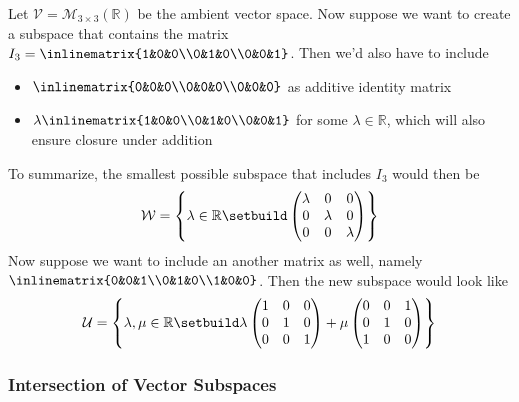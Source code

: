 \begin{exm}
	Let $\mathcal{V}=\mathcal{M}_{3 \times 3}(\mathbb{R})$ be the ambient vector
	space. Now suppose we want to create a subspace that contains the matrix
	$I_3=\inlinematrix{1&0&0\\0&1&0\\0&0&1}$.
	Then we'd also have to include
	\begin{itemize}
		\item $\inlinematrix{0&0&0\\0&0&0\\0&0&0}$ as additive identity matrix
		\item $\lambda\inlinematrix{1&0&0\\0&1&0\\0&0&1}$ for some $\lambda\in\mathbb{R}$, which will also
		      ensure closure under addition
	\end{itemize}
	To summarize, the smallest possible subspace that includes $I_3$ would then be
	\begin{equation*}
		\mathcal{W}=\left\{\lambda\in\mathbb{R}\setbuild\begin{pmatrix}
			\lambda & 0       & 0       \\
			0       & \lambda & 0       \\
			0       & 0       & \lambda
		\end{pmatrix}\right\}
	\end{equation*}
	Now suppose we want to include an another matrix as well, namely
	$\inlinematrix{0&0&1\\0&1&0\\1&0&0}$.
	Then the new subspace would look like
	\begin{equation*}
		\mathcal{U}=\left\{\lambda,\mu\in\mathbb{R}\setbuild\lambda\begin{pmatrix}
			1 & 0 & 0 \\
			0 & 1 & 0 \\
			0 & 0 & 1
		\end{pmatrix}+\mu\begin{pmatrix}
			0 & 0 & 1 \\
			0 & 1 & 0 \\
			1 & 0 & 0
		\end{pmatrix}\right\}
	\end{equation*}
\end{exm}

\subsubsection{Intersection of Vector Subspaces}\label{subsubsec-intersection-vector-subspaces}

